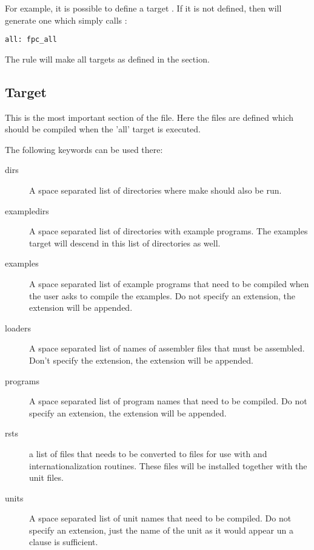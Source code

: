 For example, it is possible to define a target . If it is not
defined, then \fpcmake{} will generate one which simply calls
:
\begin{verbatim}
all: fpc_all
\end{verbatim}
The  rule will make all targets as defined in the 
section.

\subsection{Target}
This is the most important section of the  file. Here the
files are defined which should be compiled when the 'all' target is
executed. 

The following keywords can be used there:
\begin{description}
\item[dirs]
A space separated list of directories where make should also be run.
\item[exampledirs] 
A space separated list of directories with example programs. The examples
target will descend in this list of directories as well.
\item[examples]
A space separated list of example programs that need to be compiled when
the user asks to compile the examples. Do not specify an extension,
the extension will be appended.
\item[loaders]
A space separated list of names of assembler files that must be assembled.
Don't specify the extension, the extension will be appended.
\item[programs]
A space separated list of program names that need to be compiled. Do not
specify an extension, the extension will be appended.
\item[rsts] a list of  files that needs to be converted to 
files for use with \gnu {} and internationalization routines.
These files will be installed together with the unit files.
\item[units]
A space separated list of unit names that need to be compiled. Do not
specify an extension, just the name of the unit as it would appear un a
 clause is sufficient.
\end{description}

